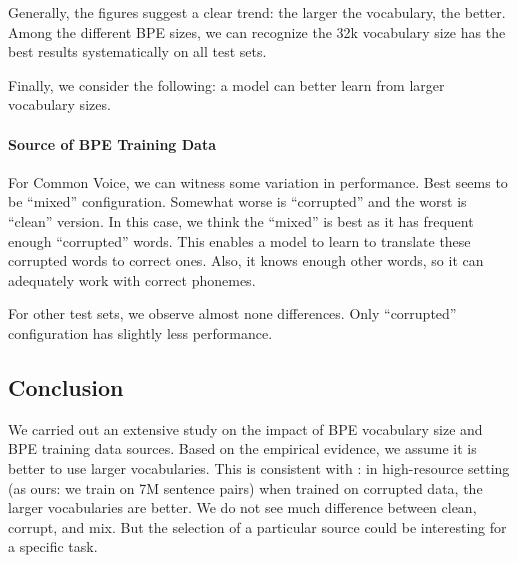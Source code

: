 Generally, the figures suggest a clear trend: the larger the vocabulary, the better. Among the different BPE sizes, we can recognize the 32k vocabulary size has the best results systematically on all test sets.

Finally, we consider the following: a model can better learn from larger vocabulary sizes. 

\paragraph{Source of BPE Training Data}
For Common Voice, we can witness some variation in performance. Best seems to be ``mixed'' configuration. Somewhat worse is ``corrupted'' and the worst is ``clean'' version. In this case, we think the ``mixed'' is best as it has frequent enough ``corrupted'' words. This enables a model to learn to translate these corrupted words to correct ones. Also, it knows enough other words, so it can adequately work with correct phonemes.

For other test sets, we observe almost none differences. Only ``corrupted'' configuration has slightly less performance. 


\subsection{Conclusion}
\label{easr:tok_conclusion}
We carried out an extensive study on the impact of BPE vocabulary size and BPE training data sources. Based on the empirical evidence, we assume it is better to use larger vocabularies. This is consistent with : in high-resource setting (as ours: we train on 7M sentence pairs) when trained on corrupted data, the larger vocabularies are better. We do not see much difference between clean, corrupt, and mix. But the selection of a particular source could be interesting for a specific task.

